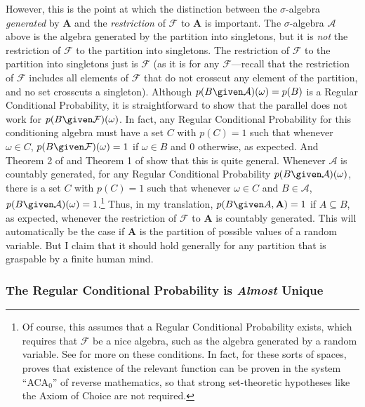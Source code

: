 However, this is the point at which the distinction between the $\sigma$-algebra \emph{generated} by $\mathbf{A}$ and the \emph{restriction} of $\mathcal{F}$ to $\mathbf{A}$ is important. The $\sigma$-algebra $\mathcal{A}$ above is the algebra generated by the partition into singletons, but it is \emph{not} the restriction of $\mathcal{F}$ to the partition into singletons. The restriction of $\mathcal{F}$ to the partition into singletons just is $\mathcal{F}$ (as it is for any $\mathcal{F}$---recall that the restriction of $\mathcal{F}$ includes all elements of $\mathcal{F}$ that do not crosscut any element of the partition, and no set crosscuts a singleton). Although $p(B \given \mathcal{A})(\omega)=p(B)$ is a Regular Conditional Probability, it is straightforward to show that the parallel does not work for $p(B \given \mathcal{F})(\omega)$. In fact, any Regular Conditional Probability for this conditioning algebra must have a set $C$ with $p(C)=1$ such that whenever $\omega\in C$, $p(B \given \mathcal{F})(\omega)=1$ if $\omega\in B$ and $0$ otherwise, as expected. And Theorem 2 of \citet{blackwelldubins} and Theorem 1 of \citet{improper} show that this is quite general. Whenever $\mathcal{A}$ is countably generated, for any Regular Conditional Probability $p(B \given \mathcal{A})(\omega)$, there is a set $C$ with $p(C)=1$ such that whenever $\omega\in C$ and $B\in\mathcal{A}$, $p(B \given \mathcal{A})(\omega)=1$.\footnote{Of course, this assumes that a Regular Conditional Probability exists, which requires that $\mathcal{F}$ be a nice algebra, such as the algebra generated by a random variable. See \citet{blackwell55} for more on these conditions. In fact, for these sorts of spaces, \citet{xkyuradon} proves that existence of the relevant function can be proven in the system ``ACA$_0$'' of reverse mathematics, so that strong set-theoretic hypotheses like the Axiom of Choice are not required.}
 Thus, in my translation, $p(B \given A,\mathbf{A})=1$ if $A\subseteq B$, as expected, whenever the restriction of $\mathcal{F}$ to $\mathbf{A}$ is countably generated. This will automatically be the case if $\mathbf{A}$ is the partition of possible values of a random variable. But I claim that it should hold generally for any partition that is graspable by a finite human mind.
 
 \subsubsection{The Regular Conditional Probability is \emph{Almost} Unique}
 
